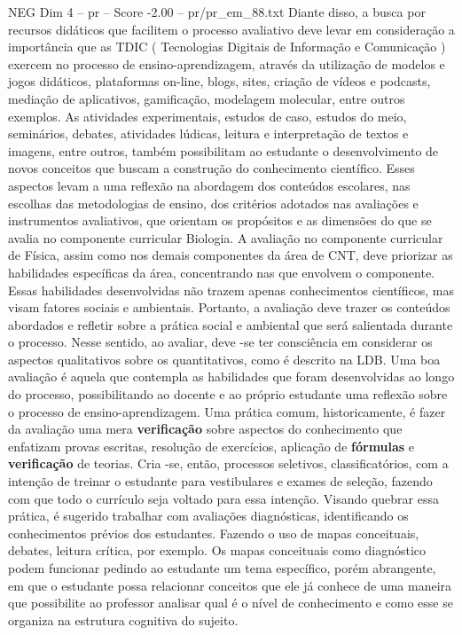 \begin{textsample}{NEG Dim 4 – pr – Score -2.00 – pr/pr\_em\_88.txt}
Diante disso, a busca por recursos didáticos que facilitem o processo avaliativo deve levar em consideração a importância que as TDIC ( Tecnologias Digitais de Informação e Comunicação ) exercem no processo de ensino-aprendizagem, através da utilização de modelos e jogos didáticos, plataformas on-line, blogs, sites, criação de vídeos e podcasts, mediação de aplicativos, gamificação, modelagem molecular, entre outros exemplos.
As atividades experimentais, estudos de caso, estudos do meio, seminários, debates, atividades lúdicas, leitura e interpretação de textos e imagens, entre outros, também possibilitam ao estudante o desenvolvimento de novos conceitos que buscam a construção do conhecimento científico.
Esses aspectos levam a uma reflexão na abordagem dos conteúdos escolares, nas escolhas das metodologias de ensino, dos critérios adotados nas avaliações e instrumentos avaliativos, que orientam os propósitos e as dimensões do que se avalia no componente curricular Biologia.
A avaliação no componente curricular de Física, assim como nos demais componentes da área de CNT, deve priorizar as habilidades específicas da área, concentrando nas que envolvem o componente.
Essas habilidades desenvolvidas não trazem apenas conhecimentos científicos, mas visam fatores sociais e ambientais.
Portanto, a avaliação deve trazer os conteúdos abordados e refletir sobre a prática social e ambiental que será salientada durante o processo.
Nesse sentido, ao avaliar, deve -se ter consciência em considerar os aspectos qualitativos sobre os quantitativos, como é descrito na LDB.
Uma boa avaliação é aquela que contempla as habilidades que foram desenvolvidas ao longo do processo, possibilitando ao docente e ao próprio estudante uma reflexão sobre o processo de ensino-aprendizagem.
Uma prática comum, historicamente, é fazer da avaliação uma mera \textbf{verificação} sobre aspectos do conhecimento que enfatizam provas escritas, resolução de exercícios, aplicação de \textbf{fórmulas} e \textbf{verificação} de teorias.
Cria -se, então, processos seletivos, classificatórios, com a intenção de treinar o estudante para vestibulares e exames de seleção, fazendo com que todo o currículo seja voltado para essa intenção.
Visando quebrar essa prática, é sugerido trabalhar com avaliações diagnósticas, identificando os conhecimentos prévios dos estudantes.
Fazendo o uso de mapas conceituais, debates, leitura crítica, por exemplo.
Os mapas conceituais como diagnóstico podem funcionar pedindo ao estudante um tema específico, porém abrangente, em que o estudante possa relacionar conceitos que ele já conhece de uma maneira que possibilite ao professor analisar qual é o nível de conhecimento e como esse se organiza na estrutura cognitiva do sujeito.

\end{textsample}
